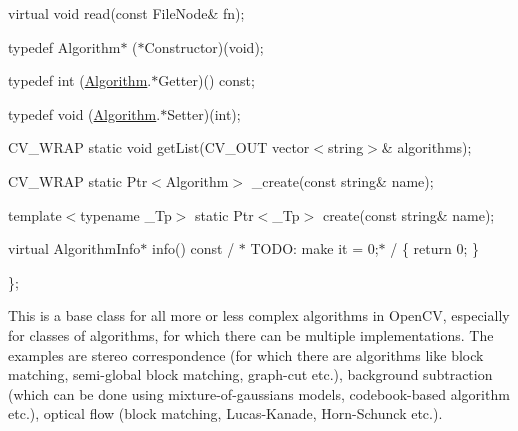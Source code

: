 {\ttfamily }

{\ttfamily }

{\ttfamily virtual void read(const File\+Node\& fn);}

{\ttfamily }

{\ttfamily }

{\ttfamily typedef Algorithm$\ast$ ($\ast$\+Constructor)(void);}

{\ttfamily }

{\ttfamily }

{\ttfamily typedef int (\mbox{\hyperlink{classorg_1_1opencv_1_1core_1_1_algorithm}{Algorithm}}.$\ast$\+Getter)() const;}

{\ttfamily }

{\ttfamily }

{\ttfamily typedef void (\mbox{\hyperlink{classorg_1_1opencv_1_1core_1_1_algorithm}{Algorithm}}.$\ast$\+Setter)(int);}

{\ttfamily }

{\ttfamily }

{\ttfamily C\+V\+\_\+\+W\+R\+AP static void get\+List(\+C\+V\+\_\+\+O\+U\+T vector$<$string$>$\& algorithms);}

{\ttfamily }

{\ttfamily }

{\ttfamily C\+V\+\_\+\+W\+R\+AP static Ptr$<$\+Algorithm$>$ \+\_\+create(const string\& name);}

{\ttfamily }

{\ttfamily }

{\ttfamily template$<$typename \+\_\+\+Tp$>$ static Ptr$<$\+\_\+\+Tp$>$ create(const string\& name);}

{\ttfamily }

{\ttfamily }

{\ttfamily virtual Algorithm\+Info$\ast$ info() const / $\ast$ T\+O\+DO\+: make it = 0;$\ast$ / \{ return 0; \}}

{\ttfamily }

{\ttfamily }

{\ttfamily \};}

{\ttfamily }

{\ttfamily }

{\ttfamily This is a base class for all more or less complex algorithms in Open\+CV, especially for classes of algorithms, for which there can be multiple implementations. The examples are stereo correspondence (for which there are algorithms like block matching, semi-\/global block matching, graph-\/cut etc.), background subtraction (which can be done using mixture-\/of-\/gaussians models, codebook-\/based algorithm etc.), optical flow (block matching, Lucas-\/\+Kanade, Horn-\/\+Schunck etc.). }

